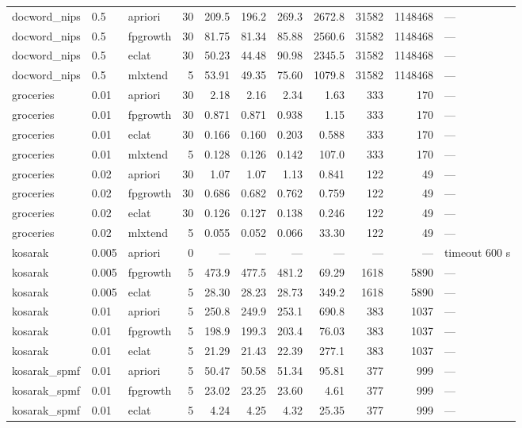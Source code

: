 \documentclass[journal,a4paper]{IEEEtran}
\begin{document}
\begin{longtable}{p{3.0cm}llrrrrrrrp{2.4cm}}
docword\_\allowbreak{}nips & 0.5 & apriori & 30 & 209.5 & 196.2 & 269.3 & 2672.8 & 31582 & 1148468 & --- \\
docword\_\allowbreak{}nips & 0.5 & fpgrowth & 30 & 81.75 & 81.34 & 85.88 & 2560.6 & 31582 & 1148468 & --- \\
docword\_\allowbreak{}nips & 0.5 & eclat & 30 & 50.23 & 44.48 & 90.98 & 2345.5 & 31582 & 1148468 & --- \\
docword\_\allowbreak{}nips & 0.5 & mlxtend & 5 & 53.91 & 49.35 & 75.60 & 1079.8 & 31582 & 1148468 & --- \\
groceries & 0.01 & apriori & 30 & 2.18 & 2.16 & 2.34 & 1.63 & 333 & 170 & --- \\
groceries & 0.01 & fpgrowth & 30 & 0.871 & 0.871 & 0.938 & 1.15 & 333 & 170 & --- \\
groceries & 0.01 & eclat & 30 & 0.166 & 0.160 & 0.203 & 0.588 & 333 & 170 & --- \\
groceries & 0.01 & mlxtend & 5 & 0.128 & 0.126 & 0.142 & 107.0 & 333 & 170 & --- \\
groceries & 0.02 & apriori & 30 & 1.07 & 1.07 & 1.13 & 0.841 & 122 & 49 & --- \\
groceries & 0.02 & fpgrowth & 30 & 0.686 & 0.682 & 0.762 & 0.759 & 122 & 49 & --- \\
groceries & 0.02 & eclat & 30 & 0.126 & 0.127 & 0.138 & 0.246 & 122 & 49 & --- \\
groceries & 0.02 & mlxtend & 5 & 0.055 & 0.052 & 0.066 & 33.30 & 122 & 49 & --- \\
kosarak & 0.005 & apriori & 0 & --- & --- & --- & --- & --- & --- & timeout 600 s \\
kosarak & 0.005 & fpgrowth & 5 & 473.9 & 477.5 & 481.2 & 69.29 & 1618 & 5890 & --- \\
kosarak & 0.005 & eclat & 5 & 28.30 & 28.23 & 28.73 & 349.2 & 1618 & 5890 & --- \\
kosarak & 0.01 & apriori & 5 & 250.8 & 249.9 & 253.1 & 690.8 & 383 & 1037 & --- \\
kosarak & 0.01 & fpgrowth & 5 & 198.9 & 199.3 & 203.4 & 76.03 & 383 & 1037 & --- \\
kosarak & 0.01 & eclat & 5 & 21.29 & 21.43 & 22.39 & 277.1 & 383 & 1037 & --- \\
kosarak\_\allowbreak{}spmf & 0.01 & apriori & 5 & 50.47 & 50.58 & 51.34 & 95.81 & 377 & 999 & --- \\
kosarak\_\allowbreak{}spmf & 0.01 & fpgrowth & 5 & 23.02 & 23.25 & 23.60 & 4.61 & 377 & 999 & --- \\
kosarak\_\allowbreak{}spmf & 0.01 & eclat & 5 & 4.24 & 4.25 & 4.32 & 25.35 & 377 & 999 & --- \\

\end{longtable}
\end{document}
